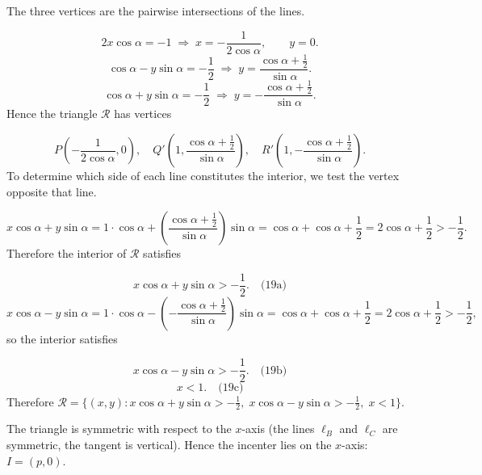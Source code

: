 \smallskip
{}
The three vertices are the pairwise intersections of the lines.\par
{}
\[
2x\cos\alpha = -1 \;\Longrightarrow\; x = -\frac{1}{2\cos\alpha},\qquad y = 0.
\]
\[
\cos\alpha - y\sin\alpha = -\frac12 \;\Longrightarrow\; y = \frac{\cos\alpha + \frac12}{\sin\alpha}.
\]
\[
\cos\alpha + y\sin\alpha = -\frac12 \;\Longrightarrow\; y = -\frac{\cos\alpha + \frac12}{\sin\alpha}.
\]
Hence the triangle \(\mathcal{R}\) has vertices\par
\[
P\left(-\frac{1}{2\cos\alpha},0\right),\quad
Q'\left(1,\frac{\cos\alpha+\frac12}{\sin\alpha}\right),\quad
R'\left(1,-\frac{\cos\alpha+\frac12}{\sin\alpha}\right).
\]
To determine which side of each line constitutes the interior, we test the vertex opposite that line.\par
{}
\[
x\cos\alpha + y\sin\alpha = 1\cdot\cos\alpha + \left(\frac{\cos\alpha+\frac12}{\sin\alpha}\right)\sin\alpha = \cos\alpha + \cos\alpha + \frac12 = 2\cos\alpha + \frac12 > -\frac12.
\]
Therefore the interior of \(\mathcal{R}\) satisfies\par
\[
x\cos\alpha + y\sin\alpha > -\frac12. \quad\text{(19a)}
\]
\[
x\cos\alpha - y\sin\alpha = 1\cdot\cos\alpha - \left(-\frac{\cos\alpha+\frac12}{\sin\alpha}\right)\sin\alpha = \cos\alpha + \cos\alpha + \frac12 = 2\cos\alpha + \frac12 > -\frac12,
\]
so the interior satisfies\par
\[
x\cos\alpha - y\sin\alpha > -\frac12. \quad\text{(19b)}
\]
\[
x < 1. \quad\text{(19c)}
\]
Therefore \(\mathcal{R} = \bigl\{(x,y) : x\cos\alpha + y\sin\alpha > -\frac12,\; x\cos\alpha - y\sin\alpha > -\frac12,\; x < 1 \bigr\}\).\par
\smallskip
{}
The triangle is symmetric with respect to the \(x\)-axis (the lines \(\ell_B\) and \(\ell_C\) are symmetric, the tangent is vertical). Hence the incenter lies on the \(x\)-axis: \(I = (p,0)\).\par
